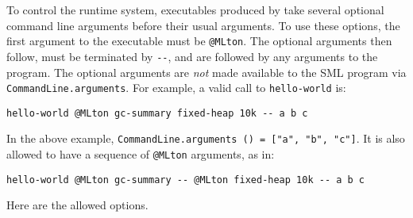
To control the runtime system, executables produced by {\mlton} take
several optional command line arguments before their usual arguments.
To use these options, the first argument to the executable must be
\verb+@MLton+.  The optional arguments then follow, must be
terminated by \verb+--+, and are followed by any arguments to the
program.  The optional arguments are {\em not} made available to the
SML program via {\tt CommandLine.arguments}.  For example, a valid
call to {\tt hello-world} is:
\begin{verbatim}
hello-world @MLton gc-summary fixed-heap 10k -- a b c
\end{verbatim}
In the above example, {\tt CommandLine.arguments () = ["a", "b",
"c"]}.  It is also allowed to have a sequence of \verb+@MLton+
arguments, as in:
\begin{verbatim}
hello-world @MLton gc-summary -- @MLton fixed-heap 10k -- a b c
\end{verbatim}

Here are the allowed options.

